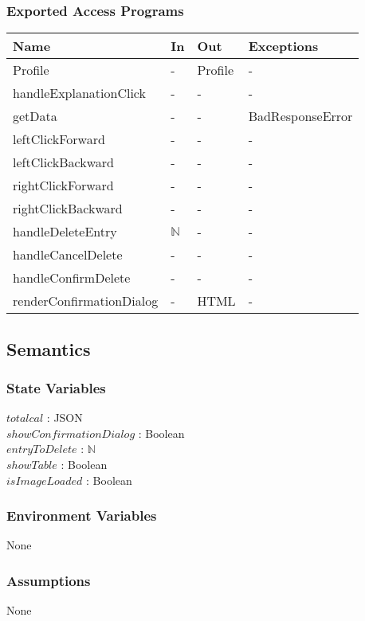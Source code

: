 \documentclass[12pt, titlepage]{article}
\begin{document}
\subsubsection{Exported Access Programs}
\begin{center}
	\begin{tabular}{p{4.7cm} p{4cm} p{4cm} p{3cm}}
		\hline
		\textbf{Name} & \textbf{In} & \textbf{Out} & \textbf{Exceptions} \\
		\hline
		Profile & - & Profile & - \\
		handleExplanationClick & - & - & - \\
		getData & - & - & BadResponseError\\
		leftClickForward & - & - & - \\
		leftClickBackward & - & - & -\\
		rightClickForward & - & - & - \\
		rightClickBackward & - & - & -\\
		handleDeleteEntry & $\mathbb{N}$ & - & -\\
		handleCancelDelete & - & - & -\\
		handleConfirmDelete & - & - & -\\
		renderConfirmationDialog & - & HTML & -\\
		\hline
	\end{tabular}
\end{center}
\subsection{Semantics}
\subsubsection{State Variables}
$totalcal$ : JSON\\
$showConfirmationDialog$ : Boolean\\
$entryToDelete$ : $\mathbb{N}$\\
$showTable$ : Boolean\\
$isImageLoaded$ : Boolean
\subsubsection{Environment Variables}
None
\subsubsection{Assumptions}
None
\end{document}

